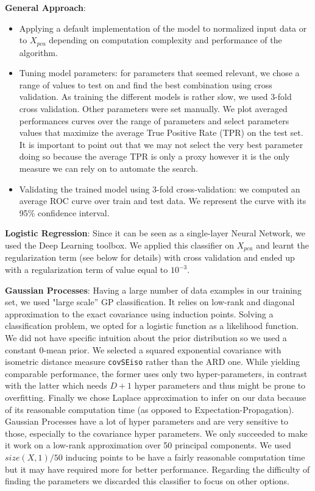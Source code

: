\documentclass[10pt,a4paper]{article}
\begin{document}
  \textbf{General Approach}:
   	\begin{itemize}
	   	\item Applying a default implementation of the model to normalized input data or to $X_{pca}$ depending on computation complexity and performance of the algorithm.
    		\item Tuning model parameters: for parameters that seemed relevant, we chose a range of values to test on and find the best combination using cross validation. As training the different models is rather slow, we used 3-fold cross validation. Other parameters were set manually. We plot averaged performances curves over the range of parameters and select parameters values that maximize the average True Positive Rate (TPR) on the test set. It is important to point out that we may not select the very best parameter doing so because the average TPR is only a proxy however it is the only measure we can rely on to automate the search.
		  \item Validating the trained model using 3-fold cross-validation: we computed an average ROC curve over train and test data. We represent the curve with its 95\% confidence interval.
	\end{itemize}

  \textbf{Logistic Regression}: Since it can be seen as a single-layer Neural Network, we used the Deep Learning toolbox. We applied this classifier on $X_{pca}$ and learnt the regularization term (see below for details) with cross validation and ended up with a regularization term of value equal to $10^{-3}$.

  \textbf{Gaussian Processes}: Having a large number of data examples in our training set, we used "large scale'' GP classification. It relies on low-rank and diagonal approximation to the exact covariance using induction points. Solving a classification problem, we opted for a logistic function as a likelihood function. We did not have specific intuition about the prior distribution so we used a constant 0-mean prior. We selected a squared exponential covariance with isometric distance measure \texttt{covSEiso} rather than the ARD one. While yielding comparable performance, the former uses only two hyper-parameters, in contrast with the latter which needs $D+1$ hyper parameters and thus might be prone to overfitting. Finally we chose Laplace approximation to infer on our data because of its reasonable computation time (as opposed to Expectation-Propagation). Gaussian Processes have a lot of hyper parameters and are very sensitive to those, especially to the covariance hyper parameters. We only succeeded to make it work on a low-rank approximation over 50 principal components. We used $size(X,1) / 50$ inducing points to be have a fairly reasonable computation time but it may have required more for better performance. Regarding the difficulty of finding the parameters we discarded this classifier to focus on other options.
\end{document}
